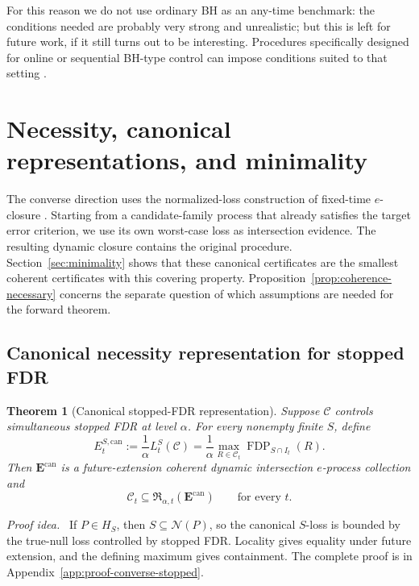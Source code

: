 \documentclass[11pt]{article}
\numberwithin{equation}{section}
\theoremstyle{plain}
\newtheorem{theorem}{Theorem}[section]
\theoremstyle{definition}
\newcommand{\C}{\mathcal C}
\newcommand{\Rfam}{\mathfrak R}
\newcommand{\FDP}{\operatorname{FDP}}
\newcommand{\calN}{\mathcal N}
\newcommand{\loss}{L}
\newcommand{\can}{\mathrm{can}}
\newcommand{\proofidea}{\par\medskip\noindent\textit{Proof idea.}\ }
\begin{document}
For this reason we do not use ordinary BH as an any-time benchmark: the conditions needed are probably very strong and unrealistic; but this is left for future work, if it still turns out to be interesting. Procedures specifically designed for online or sequential BH-type control can impose conditions suited to that setting \citep{FischerXuRamdas2024OnlineBH}. 

\section{Necessity, canonical representations, and minimality}\label{sec:converse}

The converse direction uses the normalized-loss construction of fixed-time $e$-closure \citep{XuEtAl2026Closure}. Starting from a candidate-family process that already satisfies the target error criterion, we use its own worst-case loss as intersection evidence. The resulting dynamic closure contains the original procedure. Section~\ref{sec:minimality} shows that these canonical certificates are the smallest coherent certificates with this covering property. Proposition~\ref{prop:coherence-necessary} concerns the separate question of which assumptions are needed for the forward theorem.

\subsection{Canonical necessity representation for stopped FDR}

\begin{theorem}[Canonical stopped-FDR representation]\label{thm:converse-stopped}
Suppose $\C$ controls simultaneous stopped FDR at level $\alpha$. For every nonempty finite $S$, define
\begin{equation}\label{eq:canonical-current}
  E_t^{S,\can}:=\frac1\alpha\loss_t^S(\C)
  =\frac1\alpha\max_{R\in\C_t}\FDP_{S\cap I_t}(R).
\end{equation}
Then $\mathbf E^{\can}$ is a future-extension coherent dynamic intersection $e$-process collection and
\begin{equation}\label{eq:current-containment}
  \C_t\subseteq\Rfam_{\alpha,t}(\mathbf E^{\can})
  \qquad\text{for every }t.
\end{equation}
\end{theorem}

\proofidea
If $P\in H_S$, then $S\subseteq\calN(P)$, so the canonical $S$-loss is bounded by the true-null loss controlled by stopped FDR. Locality gives equality under future extension, and the defining maximum gives containment. The complete proof is in Appendix~\ref{app:proof-converse-stopped}.
\end{document}
